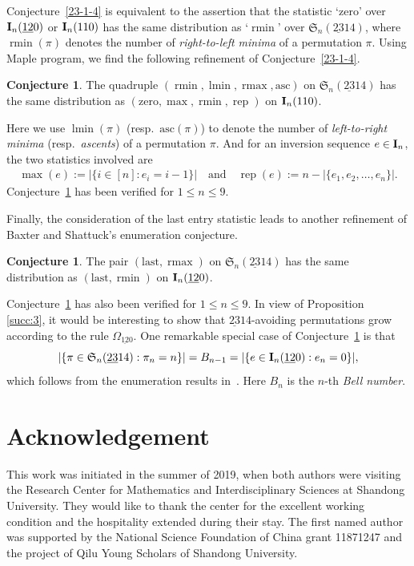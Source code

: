 \documentclass[12pt,A4]{amsart}
\numberwithin{equation}{section}
\theoremstyle{plain}
\theoremstyle{definition}
\newtheorem{conjecture}[theorem]{Conjecture}
\def\S{\mathfrak{S}}
\def\last{\mathrm{last}}
\def\zero{\mathrm{zero}}
\def\asc{\mathrm{asc}}
\def\I{\operatorname{{\bf I}}}
\def\rmin{\operatorname{rmin}}
\def\lmin{\operatorname{lmin}}
\def\rmax{\operatorname{rmax}}
\def\maxi{\operatorname{max}}
\def\rep{\operatorname{rep}}
\begin{document}
Conjecture~\ref{23-1-4} is equivalent to the assertion that the statistic `$\zero$' over $\I_n(\underline{12}0)$ or $\I_n(110)$ has the same distribution as `$\rmin$' over $\S_n(\underline{23}14)$, where $\rmin(\pi)$ denotes the number of {\em right-to-left minima} of a permutation $\pi$. 
Using Maple program, we find the following refinement of Conjecture~\ref{23-1-4}. 

\begin{conjecture}\label{conj:fu-lin}
 The quadruple $(\rmin,\lmin,\rmax,\asc)$ on $\S_n(\underline{23}14)$ has the same distribution as $(\zero,\maxi,\rmin,\rep)$ on $\I_n(110)$. 
\end{conjecture}
Here  we use $\lmin(\pi)$ (resp.~$\asc(\pi)$) to denote  the number of {\em left-to-right minima} (resp.~{\em ascents}) of a permutation $\pi$. And for an inversion sequence $e\in\I_n$, the two statistics  involved are
\begin{align*}
\maxi(e):=|\{i\in[n]: e_i=i-1\}| \quad\text{and}\quad\rep(e):=n-|\{e_1,e_2,\ldots,e_n\}|.
\end{align*}
Conjecture~\ref{conj:fu-lin} has been verified for $1\leq n\leq9$.

Finally,  the consideration of the last entry statistic  leads to another refinement of Baxter and Shattuck's enumeration conjecture. 
\begin{conjecture}\label{conj:fu-lin2}
The pair $(\last,\rmax)$ on $\S_n(\underline{23}14)$ has the same distribution as $(\last,\rmin)$ on $\I_n(\underline{12}0)$. 
\end{conjecture}
Conjecture~\ref{conj:fu-lin2} has also been verified for $1\leq n\leq9$. In view of Proposition~
\ref{succ:3}, it would be interesting to show that $\underline{23}14$-avoiding permutations grow according to the rule $\Omega_{\mathrm{\underline{12}0}}$. One remarkable special case of Conjecture~\ref{conj:fu-lin2}  is that 
$$
|\{\pi\in\S_n(\underline{23}14): \pi_n=n\}|=B_{n-1}=|\{e\in\I_n(\underline{12}0): e_n=0\}|, 
$$
which follows from the enumeration results in~\cite{cla,ly}. 
Here $B_{n}$ is the $n$-th {\em Bell number}.

\section*{Acknowledgement}
This work was initiated in the summer of 2019, when both authors were visiting the Research Center for Mathematics and Interdisciplinary Sciences at Shandong University. They would like to thank the center for the excellent working condition and the hospitality extended during their stay. The first named author was supported by the National Science Foundation of China grant 11871247 and the project of Qilu Young Scholars of Shandong University. 
\end{document}

